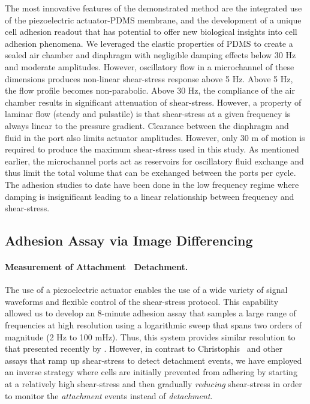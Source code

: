 The most innovative features of the demonstrated method are the integrated use of the piezoelectric actuator-PDMS membrane, and the development of a unique cell adhesion readout that has potential to offer new biological insights into cell adhesion phenomena. We leveraged the elastic properties of PDMS to create a sealed air chamber and diaphragm with negligible damping effects below 30 Hz and moderate amplitudes. However, oscillatory flow in a microchannel of these dimensions produces non-linear shear-stress response above 5 Hz. Above 5 Hz, the flow profile becomes non-parabolic. Above 30 Hz, the compliance of the air chamber results in significant attenuation of shear-stress. However, a property of laminar flow (steady and pulsatile) is that shear-stress at a given frequency is always linear to the pressure gradient. Clearance between the diaphragm and fluid in the port also limits actuator amplitudes. However, only 30 \textmu m of motion is required to produce the maximum shear-stress used in this study. As mentioned earlier, the microchannel ports act as reservoirs for oscillatory fluid exchange and thus limit the total volume that can be exchanged between the ports per cycle. The adhesion studies to date have been done in the low frequency regime where damping is insignificant leading to a linear relationship between frequency and shear-stress.

\subsection{Adhesion Assay via Image Differencing}

\paragraph{Measurement of Attachment \vs\ Detachment.}The use of a piezoelectric actuator enables the use of a wide variety of signal waveforms and flexible control of the shear-stress protocol. This capability allowed us to develop an 8-minute adhesion assay that samples a large range of frequencies at high resolution using a logarithmic sweep that spans two orders of magnitude (2 Hz to 100 mHz). Thus, this system provides similar resolution to that presented recently by \cite{Christophis:2010fk}. However, in contrast to Christophis \etal\ and other assays that ramp up shear-stress to detect detachment events, we have employed an inverse strategy where cells are initially prevented from adhering by starting at a relatively high shear-stress and then gradually \emph{reducing} shear-stress in order to monitor the \emph{attachment} events instead of \emph{detachment}.

